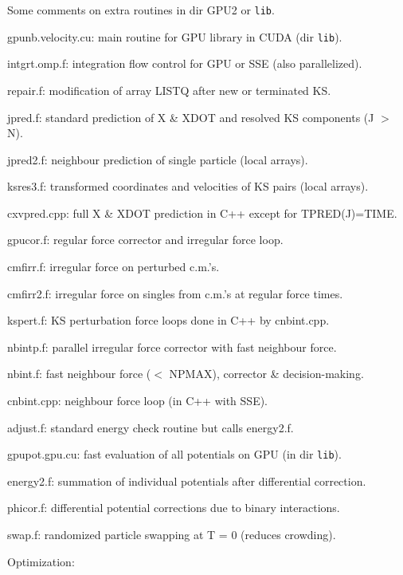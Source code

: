 \documentclass[12pt]{article}
\begin{document}
\medskip
Some comments on extra routines in dir GPU2 or {\tt lib}.

\medskip
\noindent
gpunb.velocity.cu: main routine for GPU library in CUDA (dir {\tt lib}).

\medskip
\noindent
intgrt.omp.f: integration flow control for GPU or SSE (also parallelized).

\medskip
\noindent
repair.f: modification of array LISTQ after new or terminated KS.

\medskip
\noindent
jpred.f: standard prediction of X \& XDOT and resolved KS components (J $>$ N).

\medskip
\noindent
jpred2.f: neighbour prediction of single particle (local arrays).

\medskip
\noindent
ksres3.f: transformed coordinates and velocities of KS pairs (local arrays).

\medskip
\noindent
cxvpred.cpp: full X \& XDOT prediction in C++ except for TPRED(J)=TIME.

\medskip
\noindent
gpucor.f: regular force corrector and irregular force loop.

\medskip
\noindent
cmfirr.f: irregular force on perturbed c.m.'s.

\medskip
\noindent
cmfirr2.f: irregular force on singles from c.m.'s at regular force times.

\medskip
\noindent
kspert.f: KS perturbation force loops done in C++ by cnbint.cpp.

\medskip
\noindent
nbintp.f: parallel irregular force corrector with fast neighbour force.

\medskip
\noindent
nbint.f: fast neighbour force ($<$ NPMAX), corrector \& decision-making.

\medskip
\noindent
cnbint.cpp: neighbour force loop (in C++ with SSE).

\medskip
\noindent
adjust.f: standard energy check routine but calls energy2.f.

\medskip
\noindent
gpupot.gpu.cu: fast evaluation of all potentials on GPU (in dir {\tt lib}).

\medskip
\noindent
energy2.f: summation of individual potentials after differential correction.

\medskip
\noindent
phicor.f: differential potential corrections due to binary interactions.

\medskip
\noindent
swap.f: randomized particle swapping at T = 0 (reduces crowding).

\medskip
\medskip
\noindent
Optimization:
\end{document}
